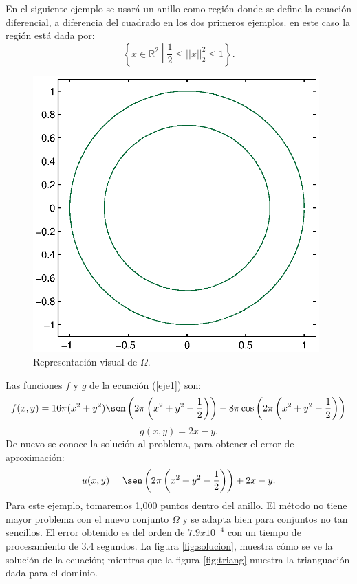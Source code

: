 \documentclass[12pt,spanish,oneside]{book}
\theoremstyle{plain}
\numberwithin{equation}{chapter}
\theoremstyle{definition}
\theoremstyle{remark}
\newcommand{\re}{\mathbb{R}}
\begin{document}
En el siguiente ejemplo se usará un anillo como región donde se define la ecuación diferencial, a diferencia del cuadrado en los dos primeros ejemplos. en este caso la región está dada por:
\[ \left \lbrace x \in \re^2 \middle| \frac{1}{2} \leq ||x||^2_2\leq 1\right\rbrace.\]
\begin{figure}[H]
\centering
\includegraphics[width=11cm]{img/dona.eps}
\caption{Representación visual de $\Omega$.}
\end{figure}
Las funciones $f$ y $g$ de la ecuación (\ref{eje1}) son:
\begin{equation}f(x,y) = 16\pi (x^2+y^2) \sen \left(2\pi\left(x^2+y^2-\frac{1}{2}\right)\right)-8\pi \cos \left(2\pi\left(x^2+y^2-\frac{1}{2}\right)\right)\label{donaprob}\end{equation}
\[g(x,y)=2x-y.\]
De nuevo se conoce la solución al problema, para obtener el error de aproximación:
\[u(x,y)=\sen\left(2\pi\left(x^2+y^2-\frac{1}{2}\right)\right) + 2x-y. \]
Para este ejemplo, tomaremos 1,000 puntos dentro del anillo. 
El método no tiene mayor problema con el nuevo conjunto $\Omega$ y se adapta bien para conjuntos no tan sencillos. El error obtenido es del orden de $7.9x10^{-4}$ con un tiempo de procesamiento de 3.4 segundos. La figura \ref{fig:solucion}, muestra cómo se ve la solución de la ecuación; mientras que la figura \ref{fig:triang} muestra la trianguación dada para el dominio.
\end{document}

